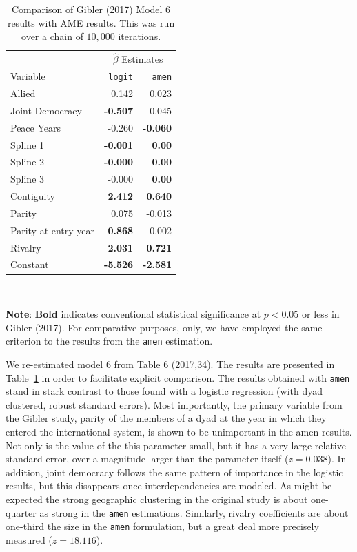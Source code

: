 \begin{table}
\begin{center}
\caption{Comparison of Gibler (2017) Model 6 results with AME results. This was run over a chain of $10,000$ iterations.  \label{tab:gibme}}
\begin{tabular}{lrr} \toprule
& \multicolumn{2}{c}{$\hat{\beta}$ Estimates}\\ \cmidrule{2-3}
Variable & \texttt{logit} & \texttt{amen} \\ \midrule
Allied & 0.142&  0.023 \\
Joint Democracy &\bf -0.507&  0.045 \\
Peace Years \bf &-0.260& \bf -0.060 \\
Spline 1 &\bf -0.001& \bf 0.00 \\
Spline 2&\bf -0.000& \bf 0.00\\
Spline 3 &-0.000& \bf 0.00\\ 
Contiguity &\bf 2.412& \bf 0.640 \\
Parity &0.075&  -0.013 \\
Parity at entry year&\bf 0.868&  0.002 \\ 
Rivalry &\bf 2.031&\bf 0.721\\ 
Constant &\bf -5.526 & \bf  -2.581\\ \bottomrule
\end{tabular}\\
\end{center}
{\bf Note}: {\bf Bold} indicates conventional statistical significance at $p < 0.05$ or less in Gibler (2017). For comparative purposes, only, we have employed the same criterion to the results from the \texttt{amen} estimation.
\end{table}

We re-estimated model 6 from Table 6 (2017,34). The results are presented in Table~\ref{tab:gibme} in order to facilitate explicit comparison.
The results obtained with \texttt{amen} stand in stark contrast to those found with a logistic regression (with dyad clustered, robust standard errors).  Most importantly, the primary variable from the Gibler study, parity of the members of a dyad at the year in which they entered the international system, is shown to be unimportant in the amen results.  Not only is the value of the this parameter small, but it has a very large relative standard error, over a magnitude larger than the parameter itself ($z= 0.038$). In addition, joint democracy follows the same pattern of importance in the logistic results, but this disappears once interdependencies are modeled.  As might be expected the strong geographic clustering in the original study is about one-quarter as strong in the \texttt{amen} estimations. Similarly, rivalry coefficients are about one-third the size in the \texttt{amen} formulation, but a great deal more precisely measured ($z=18.116$). 

